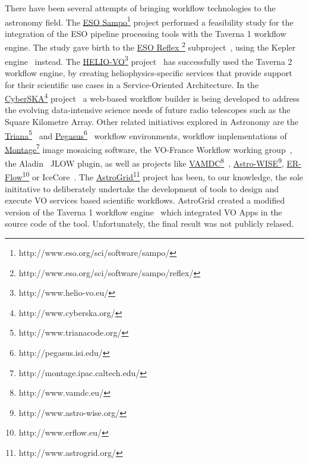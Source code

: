 \documentclass{aa}
\begin{document}
There have been several attempts of bringing workflow technologies to the astronomy field. The \href{http://www.eso.org/sci/software/sampo/}{ESO Sampo}\footnote{http://www.eso.org/sci/software/sampo/} project performed a feasibility study for the integration of the ESO pipeline processing tools with the Taverna 1 workflow engine. The study gave birth to the \href{http://www.eso.org/sci/software/sampo/reflex/}{ESO Reflex }\footnote{http://www.eso.org/sci/software/sampo/reflex/} subproject~\citep{Hook2009}, using the Kepler engine~\citep{Altintas2004} instead. The \href{http://www.helio-vo.eu/}{HELIO-VO}\footnote{http://www.helio-vo.eu/} project~\citep{Bentley2013} has successfully used the Taverna 2 workflow engine, by creating heliophysics-specific services that provide support for their scientific use cases in a Service-Oriented Architecture. In the \href{http://www.cyberska.org/}{CyberSKA}\footnote{http://www.cyberska.org/} project~\citep{Kiddle2011} a web-based workflow builder is being developed to address the evolving data-intensive science needs of future radio telescopes such as the Square Kilometre Array. Other related initiatives explored in Astronomy are the \href{http://www.trianacode.org/}{Triana}\footnote{http://www.trianacode.org/}~\citep{Taylor2007} and \href{http://pegasus.isi.edu/}{Pegasus}\footnote{http://pegasus.isi.edu/}~\citep{Deelman:2005:PFM:1239649.1239653} workflow environments, workflow implementations of \href{http://montage.ipac.caltech.edu/}{Montage}\footnote{http://montage.ipac.caltech.edu/} image mosaicing software, the VO-France Workflow working group~\citep{Schaaff2008}, the Aladin~\citep{Bonnarel2000} JLOW plugin, as well as projects like \href{http://www.vamdc.eu/}{VAMDC}\footnote{http://www.vamdc.eu/}~\citep{Walton2011}, \href{http://www.astro-wise.org/}{Astro-WISE}\footnote{http://www.astro-wise.org/}, \href{http://www.erflow.eu/}{ER-Flow}\footnote{http://www.erflow.eu/} or IceCore~\citep{Maisala2012}. The \href{http://www.astrogrid.org/}{AstroGrid}\footnote{http://www.astrogrid.org/} project has been, to our knowledge, the sole inititative to deliberately undertake the development of tools to design and execute VO services based scientific workflows. AstroGrid created a modified version of the Taverna 1 workflow engine~\citep{Benson2009, Walton2010} which integrated VO Apps in the source code of the tool. Unfortunately, the final result was not publicly relased.
\end{document}
